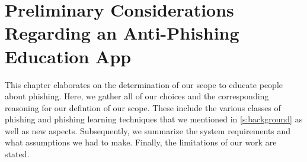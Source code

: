 \section{Preliminary Considerations Regarding an Anti-Phishing Education App}
\label{s:focus}
This chapter elaborates on the determination of our scope to educate people about phishing. 
Here, we gather all of our choices and the corresponding reasoning for our defintion of our scope. 
These include the various classes of phishing and phishing learning techniques that we mentioned in \autoref{s:background} as well as new aspects.
Subsequently, we summarize the system requirements and what assumptions we had to make. 
Finally, the limitations of our work are stated.

